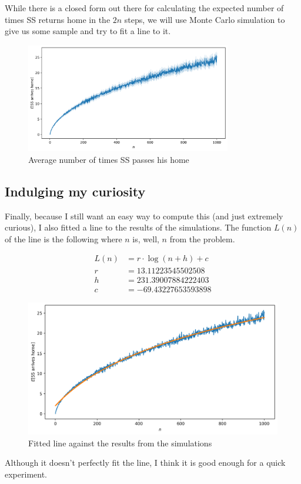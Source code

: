 While there is a closed form out there for calculating the expected number of times SS returns home in the $2n$ steps,
we will use Monte Carlo simulation to give us some sample and try to fit a line to it.

\begin{figure}[h]
	\centering
	\includegraphics[width=0.8\textwidth]{graphics/02-arriveshome.png}
	\caption{Average number of times SS passes his home}
\end{figure}

\subsection*{Indulging my curiosity}

Finally, because I still want an easy way to compute this (and just extremely curious), I also fitted a line to the results of the simulations.
The function $L(n)$ of the line is the following where $n$ is, well, $n$ from the problem.

\begin{equation}
\begin{aligned}
	L(n) &= r \cdot \log(n + h) + c \\
	r &= 13.11223545502508 \\
	h &= 231.39007884222403 \\
	c &= -69.43227653593898
\end{aligned}
\end{equation}

\begin{figure}[h]
	\centering
	\includegraphics[width=\textwidth]{graphics/02-fittedline.png}
	\caption{Fitted line against the results from the simulations}
\end{figure}

Although it doesn't perfectly fit the line, I think it is good enough for a quick experiment.
